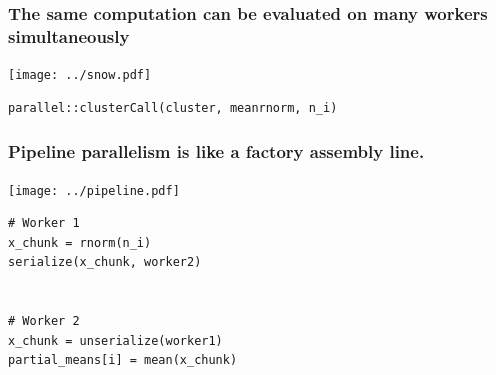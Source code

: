 \documentclass{beamer}
\begin{document}
\begin{frame}[fragile]

    \frametitle{The same computation can be evaluated on many workers
    simultaneously}

\centerline{\texttt{[image: ../snow.pdf]}}

\begin{verbatim}
parallel::clusterCall(cluster, meanrnorm, n_i)
\end{verbatim}

\end{frame}
\begin{frame}[fragile]

    \frametitle{Pipeline parallelism is like a factory assembly line.}

\centerline{\texttt{[image: ../pipeline.pdf]}}

\begin{verbatim}
# Worker 1
x_chunk = rnorm(n_i)
serialize(x_chunk, worker2)


# Worker 2
x_chunk = unserialize(worker1)
partial_means[i] = mean(x_chunk)
\end{verbatim}

\end{frame}
\end{document}
